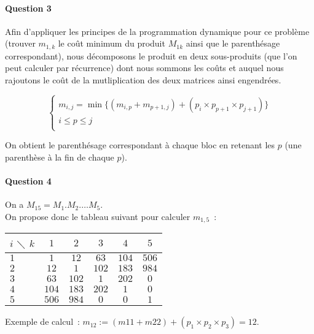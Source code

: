 \paragraph{Question 3}

Afin d'appliquer les principes de la programmation dynamique pour ce
problème (trouver $m_{1,k}$ le coût minimum du produit $M_{1k}$ ainsi
que le parenthésage correspondant), nous décomposons le produit en
deux sous-produits (que l'on peut calculer par récurrence) dont nous
sommons les coûts et auquel nous rajoutons le coût de la
mutliplication des deux matrices ainsi engendrées.

\begin{equation}
\begin{cases}
m_{i,j} = \min \{(m_{i,p}+m_{p+1,j}) + (p_i \times p_{p+1} \times p_{j+1}) \} \\
i \leq p \leq j \\
\end{cases}
\end{equation}

On obtient le parenthésage correspondant à chaque bloc en retenant les
$p$ (une parenthèse à la fin de chaque $p$).

\paragraph{Question 4}

On a $M_{15} = M_1.M_2.\dots M_5$. \\

On propose donc le tableau suivant pour calculer $m_{1,5}$~:
\begin{center}
\begin{tabular}{|l|c|c|c|c|c|}
\hline  $i$ $\diagdown$ $k$ & $1$  & $2$ & $3$ & $4$ & $5$ \\
\hline $1$ & $1$ & $12$ & $63$ & $104$ & $506$ \\
\hline $2$ & $12$ & $1$ & $102$ & $183$ & $984$ \\
\hline $3$ & $63$ & $102$ & $1$ & $202$ & $0$ \\
\hline $4$ & $104$ & $183$ & $202$ & $1$ & $0$ \\
\hline $5$ & $506$ & $984$ & $0$ & $0$ & $1$ \\
\hline
\end{tabular}
\end{center}

Exemple de calcul~: $m_{12} := (m{11} + m{22}) + (p_1 \times
p_2 \times p_3) = 12$.

